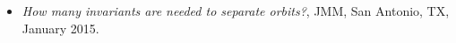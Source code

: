 \documentclass[12pt]{amsart}
\begin{document}
\begin{itemize}[leftmargin=9mm]
		\item \emph{How many invariants are needed to separate
			orbits?}, JMM, San Antonio, TX, January 2015.

\end{itemize}
\end{document}
